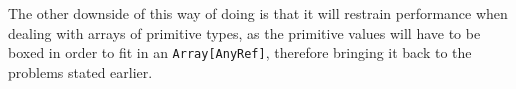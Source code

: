 The other downside of this way of doing is that it will restrain performance when dealing with arrays of primitive types, as the primitive values will have to be boxed in order to fit in an \lstinline|Array[AnyRef]|, therefore bringing it back to the problems stated earlier.

